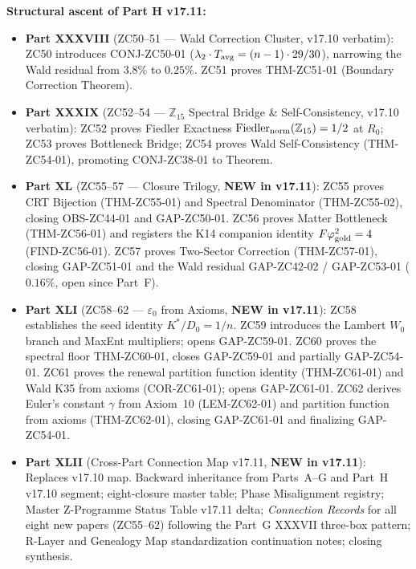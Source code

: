 \documentclass[11pt, a4paper]{article}
\begin{document}
\begin{volumebox}[title={Part H --- CRF Complete Edition v17.11
  (Parts XXXVIII--XLII, extended)}]
\textbf{Structural ascent of Part H v17.11:}
\begin{itemize}[noitemsep,leftmargin=1.5em]
  \item \textbf{Part XXXVIII} (ZC50--51 --- Wald Correction Cluster,
    v17.10 verbatim): ZC50 introduces CONJ-ZC50-01
    ($\lambda_2\cdot T_{\rm avg} = (n-1)\cdot 29/30$), narrowing the
    Wald residual from $3.8\%$ to $0.25\%$. ZC51 proves
    THM-ZC51-01 (Boundary Correction Theorem).
  \item \textbf{Part XXXIX} (ZC52--54 --- $\mathbb{Z}_{15}$ Spectral
    Bridge \& Self-Consistency, v17.10 verbatim): ZC52 proves Fiedler
    Exactness $\mathrm{Fiedler}_{\rm norm}(\mathbb{Z}_{15})=1/2$
    at $R_0$; ZC53 proves Bottleneck Bridge; ZC54 proves Wald
    Self-Consistency (THM-ZC54-01), promoting CONJ-ZC38-01 to Theorem.
  \item \textbf{Part XL} (ZC55--57 --- Closure Trilogy, \textbf{NEW
    in v17.11}): ZC55 proves CRT Bijection (THM-ZC55-01) and Spectral
    Denominator (THM-ZC55-02), closing OBS-ZC44-01 and GAP-ZC50-01.
    ZC56 proves Matter Bottleneck (THM-ZC56-01) and registers the
    K14 companion identity $F\varphi_{\rm gold}^{2}=4$ (FIND-ZC56-01).
    ZC57 proves Two-Sector Correction (THM-ZC57-01), closing
    GAP-ZC51-01 and the Wald residual GAP-ZC42-02 / GAP-ZC53-01
    ($0.16\%$, open since Part~F).
  \item \textbf{Part XLI} (ZC58--62 --- $\varepsilon_0$ from Axioms,
    \textbf{NEW in v17.11}): ZC58 establishes the seed identity
    $K^{*}/D_0 = 1/n$. ZC59 introduces the Lambert $W_0$ branch and
    MaxEnt multipliers; opens GAP-ZC59-01. ZC60 proves the spectral
    floor THM-ZC60-01, closes GAP-ZC59-01 and partially GAP-ZC54-01.
    ZC61 proves the renewal partition function identity (THM-ZC61-01)
    and Wald K35 from axioms (COR-ZC61-01); opens GAP-ZC61-01.
    ZC62 derives Euler's constant $\gamma$ from Axiom~10
    (LEM-ZC62-01) and partition function from axioms (THM-ZC62-01),
    closing GAP-ZC61-01 and finalizing GAP-ZC54-01.
  \item \textbf{Part XLII} (Cross-Part Connection Map v17.11,
    \textbf{NEW in v17.11}): Replaces v17.10 map. Backward inheritance
    from Parts~A--G and Part~H v17.10 segment; eight-closure master
    table; Phase Misalignment registry; Master Z-Programme Status Table
    v17.11 delta; \emph{Connection Records} for all eight new papers
    (ZC55--62) following the Part~G XXXVII three-box pattern;
    R-Layer and Genealogy Map standardization continuation notes;
    closing synthesis.
\end{itemize}


\end{volumebox}
\end{document}
